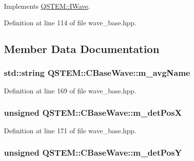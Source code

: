 Implements \hyperlink{class_q_s_t_e_m_1_1_i_wave_a9e9f05935b04646a547d2d20e9cf9731}{Q\-S\-T\-E\-M\-::\-I\-Wave}.



Definition at line 114 of file wave\-\_\-base.\-hpp.



\subsection{Member Data Documentation}
\hypertarget{class_q_s_t_e_m_1_1_c_base_wave_ac9fac50838e8cc873467504c4d7d0b1a}{
\subsubsection[{m\-\_\-avg\-Name}]{\setlength{\rightskip}{0pt plus 5cm}std\-::string Q\-S\-T\-E\-M\-::\-C\-Base\-Wave\-::m\-\_\-avg\-Name\hspace{0.3cm}{\ttfamily [protected]}}}\label{class_q_s_t_e_m_1_1_c_base_wave_ac9fac50838e8cc873467504c4d7d0b1a}


Definition at line 169 of file wave\-\_\-base.\-hpp.

\hypertarget{class_q_s_t_e_m_1_1_c_base_wave_a3d8f8283e497584b251359a13776f0bb}{
\subsubsection[{m\-\_\-det\-Pos\-X}]{\setlength{\rightskip}{0pt plus 5cm}unsigned Q\-S\-T\-E\-M\-::\-C\-Base\-Wave\-::m\-\_\-det\-Pos\-X\hspace{0.3cm}{\ttfamily [protected]}}}\label{class_q_s_t_e_m_1_1_c_base_wave_a3d8f8283e497584b251359a13776f0bb}


Definition at line 171 of file wave\-\_\-base.\-hpp.

\hypertarget{class_q_s_t_e_m_1_1_c_base_wave_a27adef2b5cac5a0b353b947333e5f4a1}{
\subsubsection[{m\-\_\-det\-Pos\-Y}]{\setlength{\rightskip}{0pt plus 5cm}unsigned Q\-S\-T\-E\-M\-::\-C\-Base\-Wave\-::m\-\_\-det\-Pos\-Y\hspace{0.3cm}{\ttfamily [protected]}}}\label{class_q_s_t_e_m_1_1_c_base_wave_a27adef2b5cac5a0b353b947333e5f4a1}


